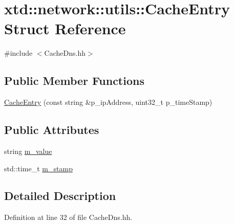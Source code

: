 \hypertarget{structxtd_1_1network_1_1utils_1_1CacheEntry}{\section{xtd\-:\-:network\-:\-:utils\-:\-:Cache\-Entry Struct Reference}
\label{structxtd_1_1network_1_1utils_1_1CacheEntry}
}


{\ttfamily \#include $<$Cache\-Dns.\-hh$>$}

\subsection*{Public Member Functions}
\begin{DoxyCompactItemize}
\item 
\hyperlink{structxtd_1_1network_1_1utils_1_1CacheEntry_acaf6749bc9eb587ffe1181dd4d7306b5}{Cache\-Entry} (const string \&p\-\_\-ip\-Address, uint32\-\_\-t p\-\_\-time\-Stamp)
\end{DoxyCompactItemize}
\subsection*{Public Attributes}
\begin{DoxyCompactItemize}
\item 
string \hyperlink{structxtd_1_1network_1_1utils_1_1CacheEntry_abbe786f1da8194495f1e36d8de8ba0b3}{m\-\_\-value}
\item 
std\-::time\-\_\-t \hyperlink{structxtd_1_1network_1_1utils_1_1CacheEntry_a277e95a1f5e0485e98568b7a583b0184}{m\-\_\-stamp}
\end{DoxyCompactItemize}


\subsection{Detailed Description}


Definition at line 32 of file Cache\-Dns.\-hh.



